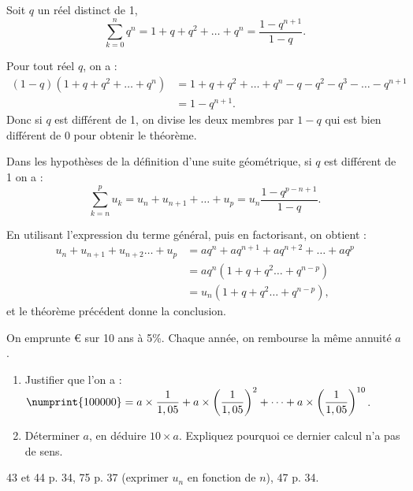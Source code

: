 \documentclass[a4paper,11pt,DIV20,BCOR0mm]{scrartcl}
\begin{document}
\begin{theoreme}
Soit $q$ un réel distinct de 1,
 \[
  \sum_{k=0}^{n}q^n=1+q+q^2+\dots+q^n=\frac{1-q^{n+1}}{1-q}.
 \]
\end{theoreme}
\begin{demonstration}
 Pour tout réel $q$, on a :
\begin{align*}
 (1-q)(1+q+q^2+\dots+q^n)&=1+q+q^2+\dots+q^n-q-q^2-q^3-\dots-q^{n+1}\\
			 &=1-q^{n+1}.
\end{align*}
Donc si $q$ est différent de 1, on divise les deux membres par $1-q$
qui est bien différent de 0 pour obtenir le théorème.
\end{demonstration}
\begin{theoreme}
Dans les hypothèses de la définition d'une suite géométrique, si $q$ est différent de 1
on a :
 \[
  \sum_{k=n}^{p}u_k=u_n+u_{n+1}+\dots+u_{p}=u_n\frac{1-q^{p-n+1}}{1-q}.
 \]
\end{theoreme}
\begin{demonstration}
 En utilisant l'expression du terme général, puis en factorisant, on obtient :
\begin{align*}
 u_n+u_{n+1}+u_{n+2}\dots+u_{p}&=aq^n+aq^{n+1}+aq^{n+2}+\dots+aq^p\\
			&=aq^n(1+q+q^2\dots+q^{n-p})\\
			&=u_n(1+q+q^2\dots+q^{n-p}),
\end{align*}
et le théorème précédent donne la conclusion.
\end{demonstration}

\begin{exercice}
 On emprunte \euro{} sur 10 ans à 5\%.
Chaque année, on rembourse la même annuité $a$.
\begin{enumerate}
 \item Justifier que l'on a : $\numprint{100000}=a\times\dfrac{1}{1,05}+a\times{\left(\dfrac{1}{1,05}\right)}^2+\cdots+a\times{\left(\dfrac{1}{1,05}\right)}^{10}$.
 \item Déterminer $a$, en déduire $10\times a$. Expliquez pourquoi ce dernier calcul n'a pas de sens.
\end{enumerate}

\end{exercice}

\begin{exercice}
43 et 44 p. 34, 75 p. 37 (exprimer $u_n$ en fonction de $n$), 47 p. 34.
\end{exercice}
\end{document}
